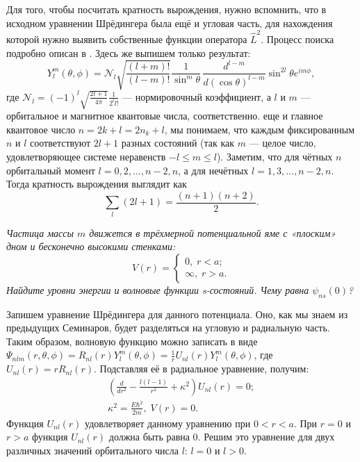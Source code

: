 Для того, чтобы посчитать кратность вырождения, нужно вспомнить, что в исходном
уравнении Шрёдингера была ещё и угловая часть, для нахождения которой нужно
выявить собственные функции оператора $\hat{L}^2$. Процесс поиска подробно
описан в . Здесь же выпишем только результат:
\[
  Y^m_l(\theta, \phi) = \mathcal{N}_l\sqrt{\frac{(l+m)!}{(l-m)!}} \frac{1}{\sin^{m}\theta}\,\frac{d^{l-m}}{d(\cos\theta)^{l-m}}\sin^{2l}\theta e^{im\phi},
\]
где $\mathcal{N}_l = (-1)^l \sqrt{\frac{2l+1}{4\pi}}\frac{1}{2^l l!}$ ---
нормировочный коэффициент, а $l$ и $m$ --- орбитальное и магнитное квантовые
числа, соответственно. \bigskip {} еще и главное квантовое число
$n=2k+l=2n_k+l$, мы понимаем, что каждым фиксированным $n$ и $l$ соответствуют
$2l+1$ разных состояний (так как $m$ --- целое число, удовлетворяющее системе
неравенств $-l\leq m\leq l$). Заметим, что для чётных $n$ орбитальный момент $l
  = 0, 2, \dots, n-2, n$, а для нечётных $l = 1, 3, \dots, n-2, n$. Тогда
кратность вырождения выглядит как
\[
  \sum_l (2l+1) = \frac{(n+1)(n+2)}{2}.
\]
\qedsq

\begin{exercise}
  \textit{Частица массы $m$ движется в трёхмерной потенциальной яме с «плоским»
    дном и бесконечно высокими стенками:}
  \[
    V(r)=
    \begin{cases}
      0,\; r<a;\\
      \infty, \; r>a.
    \end{cases}
  \]
  \textit{Найдите уровни энергии и волновые функции s-состояний. Чему равна
    $\psi_{ns}(0)$?}
\end{exercise}

Запишем уравнение Шрёдингера для данного потенциала. Оно, как мы знаем из
предыдущих Семинаров, будет разделяться на угловую и радиальную часть. Таким
образом, волновую функцию можно записать в виде $\Psi_{nlm}(r, \theta, \phi) =
  R_{nl}(r)Y^{m}_l(\theta, \phi) = \frac{1}{r}U_{nl}(r)Y^{m}_l(\theta, \phi)$,
где $U_{nl}(r) = rR_{nl}(r)$. Подставляя её в радиальное уравнение, получим:
\begin{gather*}
  \left(\frac{d}{dr^2} - \frac{l(l-1)}{r^2} + \kappa^2\right)U_{nl}(r) = 0;\\
  \kappa^2 = \frac{E\hbar^2}{2m},\; V(r) = 0.
\end{gather*}
Функция $U_{nl}(r)$ удовлетворяет данному уравнению при $ 0 < r < a$. При $r =
  0$ и $r > a$ функция $U_{nl}(r)$ должна быть равна 0. Решим это уравнение для
двух различных значений орбитального числа $l$: $l = 0$ и $l>0$.

